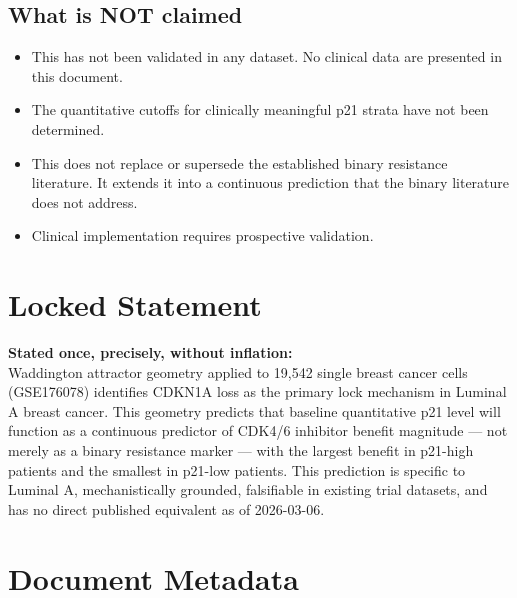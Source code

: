 \documentclass[12pt, a4paper]{article}
\begin{document}
\subsection{What is NOT claimed}

\begin{itemize}
    \item This has not been validated in any dataset.
    No clinical data are presented in this document.
    \item The quantitative cutoffs for clinically
    meaningful p21 strata have not been determined.
    \item This does not replace or supersede the
    established binary resistance literature. It extends
    it into a continuous prediction that the binary
    literature does not address.
    \item Clinical implementation requires prospective
    validation.
\end{itemize}

\section{Locked Statement}

\begin{center}
\colorbox{findingbox}{
\begin{minipage}{0.88\textwidth}
\vspace{0.6em}
\textbf{Stated once, precisely, without inflation:}\\[0.5em]
Waddington attractor geometry applied to 19,542 single
breast cancer cells (GSE176078) identifies CDKN1A loss
as the primary lock mechanism in Luminal A breast cancer.
This geometry predicts that baseline quantitative p21
level will function as a continuous predictor of CDK4/6
inhibitor benefit magnitude --- not merely as a binary
resistance marker --- with the largest benefit in
p21-high patients and the smallest in p21-low patients.
This prediction is specific to Luminal A, mechanistically
grounded, falsifiable in existing trial datasets, and
has no direct published equivalent as of 2026-03-06.
\vspace{0.5em}
\end{minipage}}
\end{center}

\section{Document Metadata}
\end{document}

